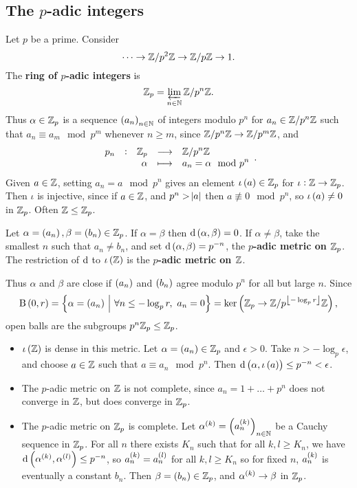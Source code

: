 \subsection{The \texorpdfstring{$ p $}{p}-adic integers}


Let $ p $ be a prime. Consider
$$ \dots \to \mathbb{Z} / p^2\mathbb{Z} \to \mathbb{Z} / p\mathbb{Z} \to 1. $$
The \textbf{ring of $ p $-adic integers} is
$$ \mathbb{Z}_p = \varprojlim_{n \in \mathbb{N}} \mathbb{Z} / p^n\mathbb{Z}. $$
Thus $ \alpha \in \mathbb{Z}_p $ is a sequence $ \br{a_n}_{n \in \NN} $ of integers modulo $ p^n $ for $ a_n \in \mathbb{Z} / p^n\mathbb{Z} $ such that $ a_n \equiv a_m \mod p^m $ whenever $ n \ge m $, since $ \mathbb{Z} / p^n\mathbb{Z} \to \mathbb{Z} / p^m\mathbb{Z} $, and
$$ \function[p_n]{\ZZ_p}{\ZZ / p^n\ZZ}{\alpha}{a_n = \alpha \mod p^n}. $$
Given $ a \in \mathbb{Z} $, setting $ a_n = a \mod p^n $ gives an element $ \iota\br{a} \in \ZZ_p $ for $ \iota : \mathbb{Z} \to \mathbb{Z}_p $. Then $ \iota $ is injective, since if $ a \in \mathbb{Z} $, and $ p^n > \abs{a} $ then $ a \not\equiv 0 \mod p^n $, so $ \iota\br{a} \ne 0 $ in $ \mathbb{Z}_p $. Often $ \mathbb{Z} \le \mathbb{Z}_p $.

\begin{definition}
Let $ \alpha = \br{a_n}, \beta = \br{b_n} \in \ZZ_p $. If $ \alpha = \beta $ then $ \d\br{\alpha, \beta} = 0 $. If $ \alpha \ne \beta $, take the smallest $ n $ such that $ a_n \ne b_n $, and set $ \d\br{\alpha, \beta} = p^{-n} $, the \textbf{$ p $-adic metric on $ \mathbb{Z}_p $}. The restriction of $ \mathrm{d} $ to $ \iota\br{\ZZ} $ is the \textbf{$ p $-adic metric on $ \mathbb{Z} $}.
\end{definition}

Thus $ \alpha $ and $ \beta $ are close if $ \br{a_n} $ and $ \br{b_n} $ agree modulo $ p^n $ for all but large $ n $. Since
$$ \B\br{0, r} = \cbr{\alpha = \br{a_n} \st \forall n \le -\log_p r, \ a_n = 0} = \ker \br{\ZZ_p \to \ZZ / p^{\fbr{-\log_p r}}\ZZ}, $$
open balls are the subgroups $ p^n\mathbb{Z}_p \le \mathbb{Z}_p $.

\begin{itemize}
\item $ \iota\br{\ZZ} $ is dense in this metric. Let $ \alpha = \br{a_n} \in \ZZ_p $ and $ \epsilon > 0 $. Take $ n > -\log_p \epsilon $, and choose $ a \in \mathbb{Z} $ such that $ a \equiv a_n \mod p^n $. Then $ \d\br{\alpha, \iota\br{a}} \le p^{-n} < \epsilon $.
\item The $ p $-adic metric on $ \mathbb{Z} $ is not complete, since $ a_n = 1 + \dots + p^n $ does not converge in $ \mathbb{Z} $, but does converge in $ \mathbb{Z}_p $.
\item The $ p $-adic metric on $ \mathbb{Z}_p $ is complete. Let $ \alpha^{\br{k}} = \br{a_n^{\br{k}}}_{n \in \NN} $ be a Cauchy sequence in $ \mathbb{Z}_p $. For all $ n $ there exists $ K_n $ such that for all $ k, l \ge K_n $, we have $ \d\br{\alpha^{\br{k}}, \alpha^{\br{l}}} \le p^{-n} $, so $ a_n^{\br{k}} = a_n^{\br{l}} $ for all $ k, l \ge K_n $ so for fixed $ n $, $ a_n^{\br{k}} $ is eventually a constant $ b_n $. Then $ \beta = \br{b_n} \in \ZZ_p $, and $ \alpha^{\br{k}} \to \beta $ in $ \mathbb{Z}_p $.
\end{itemize}

